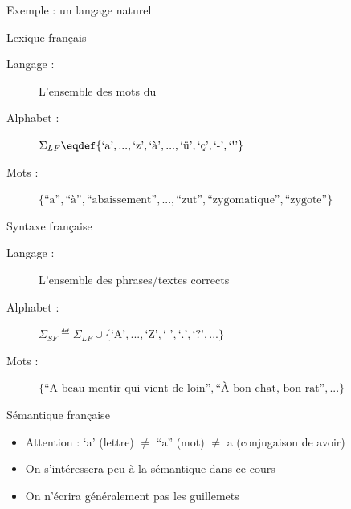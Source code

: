 
\begingroup

\begin{frame}{Exemple : un langage naturel}

  \begin{block}{Lexique français}
    \begin{description}
    \item[Langage :] L'ensemble des mots du 
    \item[Alphabet :] $\Sigma_{LF} \eqdef \{\text{`a'}, ...,  \text{`z'}, \text{`à'}, ..., \text{`ü'}, \text{`ç'}, \text{`-'}, \text{`\textquotesingle'}\}$
    \item[Mots :] $\{\text{``a''}, \text{``à''}, \text{``abaissement''}, ..., \text{``zut''}, \text{``zygomatique''}, \text{``zygote''}\}$
    \end{description}
  \end{block}
  
  \pause
  \begin{block}{Syntaxe française}
    \begin{description}
    \item[Langage :] L'ensemble des phrases/textes  corrects
    \item[Alphabet :] $\Sigma_{SF} \eqdef \Sigma_{LF} \cup \{\text{`A'}, ..., \text{`Z'}, \text{`~'}, \text{`.'}, \text{`?'}, ...\}$
    \item[Mots :] $\{\text{``A beau mentir qui vient de loin''}, \text{``À bon chat, bon rat''}, ...\}$
    \end{description}
  \end{block}
  
  \pause
  \begin{alertblock}{Sémantique française}
    \begin{itemize}
    \item \alert{Attention :} `a' (lettre) $\neq$ ``a'' (mot) $\neq$ a (conjugaison de avoir)
    \item On s'intéressera peu à la sémantique dans ce cours
    \item On n'écrira généralement pas les guillemets
    \end{itemize}
  \end{alertblock}

\end{frame}

\endgroup
\endinput
